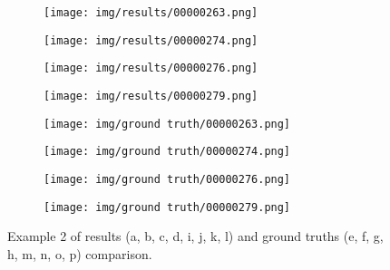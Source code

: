 \documentclass[conference]{IEEEtran}
\begin{document}
\begin{figure*}[htbp]
        \begin{subfigure}[b]{0.22\linewidth}
            \centering
            \texttt{[image: img/results/00000263.png]}
            \caption{}
            \label{res:2:263}
        \end{subfigure}
        \hfill
        \begin{subfigure}[b]{0.22\linewidth}
            \centering
            \texttt{[image: img/results/00000274.png]}
            \caption{}
            \label{res:2:274}
        \end{subfigure}
        \hfill
        \begin{subfigure}[b]{0.22\linewidth}
            \centering
            \texttt{[image: img/results/00000276.png]}
            \caption{}
            \label{res:2:276}
        \end{subfigure}
        \hfill
        \begin{subfigure}[b]{0.22\linewidth}
            \centering
            \texttt{[image: img/results/00000279.png]}
            \caption{}
            \label{res:2:279}
        \end{subfigure}

        \begin{subfigure}[b]{0.22\linewidth}
            \centering
            \texttt{[image: img/ground truth/00000263.png]}
            \caption{}
            \label{res:2:263:gt}
        \end{subfigure}
        \hfill
        \begin{subfigure}[b]{0.22\linewidth}
            \centering
            \texttt{[image: img/ground truth/00000274.png]}
            \caption{}
            \label{res:2:274:gt}
        \end{subfigure}
        \hfill
        \begin{subfigure}[b]{0.22\linewidth}
            \centering
            \texttt{[image: img/ground truth/00000276.png]}
            \caption{}
            \label{res:2:276:gt}
        \end{subfigure}
        \hfill
        \begin{subfigure}[b]{0.22\linewidth}
            \centering
            \texttt{[image: img/ground truth/00000279.png]}
            \caption{}
            \label{res:2:279:gt}
        \end{subfigure}

        \caption{Example 2 of results (a, b, c, d, i, j, k, l) and ground truths (e, f, g, h, m, n, o, p) comparison.}
        \label{res:2}
    \end{figure*}
\end{document}
